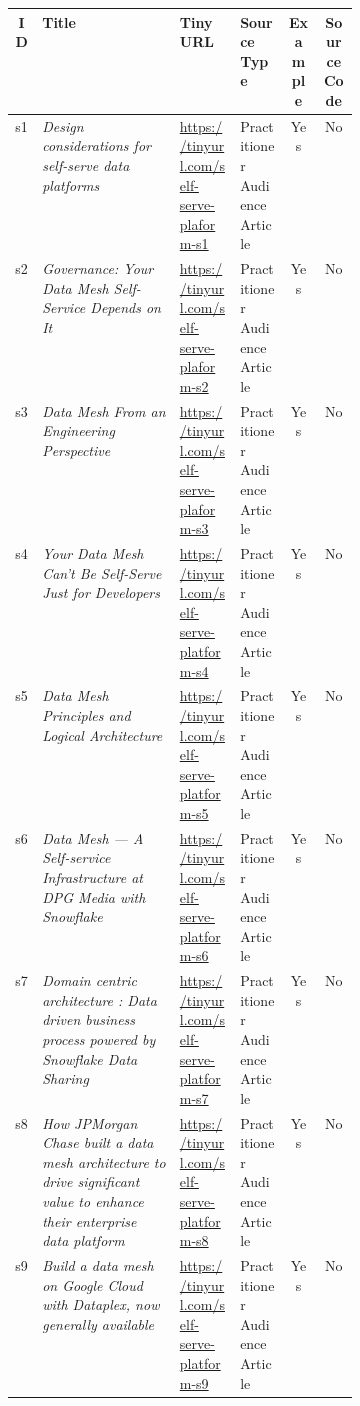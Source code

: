 \begin{tabular}{|c|p{0.4\linewidth}|l|l|c|c|}
\hline
{\bf ID} & {\bf Title} & {\bf Tiny URL} & {\bf Source Type} & {\bf Example} & {\bf Source Code}\\
\hline
s1 &  {\em Design considerations for self-serve data platforms} & \href{https://https://tinyurl.com/self-serve-plaform-s1}{https://tinyurl.com/self-serve-plaform-s1} & Practitioner Audience Article & Yes & No\\
s2 &  {\em Governance: Your Data Mesh Self-Service Depends on It} & \href{https://thenewstack.io/governance-your-data-mesh-self-service-depends-on-it/}{https://tinyurl.com/self-serve-plaform-s2} & Practitioner Audience Article & Yes & No\\
s3 &  {\em Data Mesh From an Engineering Perspective} & \href{https://https://tinyurl.com/self-serve-plaform-s3}{https://tinyurl.com/self-serve-plaform-s3} & Practitioner Audience Article & Yes & No\\
s4 &  {\em Your Data Mesh Can’t Be Self-Serve Just for Developers} & \href{https://https://tinyurl.com/self-serve-platform-s4}{https://tinyurl.com/self-serve-platform-s4} & Practitioner Audience Article & Yes & No\\
s5 &  {\em Data Mesh Principles and Logical Architecture} & \href{https://https://tinyurl.com/self-serve-platform-s5}{https://tinyurl.com/self-serve-platform-s5} & Practitioner Audience Article & Yes & No\\
s6 &  {\em Data Mesh — A Self-service Infrastructure at DPG Media with Snowflake} & \href{https://https://tinyurl.com/self-serve-platform-s6}{https://tinyurl.com/self-serve-platform-s6} & Practitioner Audience Article & Yes & No\\
s7 &  {\em Domain centric architecture : Data driven business process powered by Snowflake Data Sharing} & \href{https://https://tinyurl.com/self-serve-platform-s7}{https://tinyurl.com/self-serve-platform-s7} & Practitioner Audience Article & Yes & No\\
s8 &  {\em How JPMorgan Chase built a data mesh architecture to drive significant value to enhance their enterprise data platform} & \href{https://https://tinyurl.com/self-serve-platform-s8}{https://tinyurl.com/self-serve-platform-s8} & Practitioner Audience Article & Yes & No\\
s9 &  {\em Build a data mesh on Google Cloud with Dataplex, now generally available} & \href{https://https://tinyurl.com/self-serve-platform-s9}{https://tinyurl.com/self-serve-platform-s9} & Practitioner Audience Article & Yes & No\\

\end{tabular}
